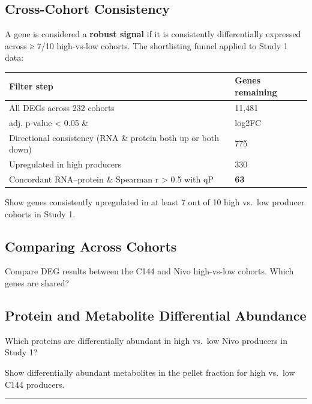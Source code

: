 \documentclass[
  letterpaper,
  oneside,
  open=any]{scrbook}
\newcounter{none} %
\begin{document}
\subsection{Cross-Cohort Consistency}\label{cross-cohort-consistency}

A gene is considered a \textbf{robust signal} if it is consistently
differentially expressed across ≥ 7/10 high-vs-low cohorts. The
shortlisting funnel applied to Study 1 data:

{\def\LTcaptype{none} %
\begin{longtable}[]{@{}ll@{}}
\toprule\noalign{}
Filter step & Genes remaining \\
\midrule\noalign{}
\endhead
\bottomrule\noalign{}
\endlastfoot
All DEGs across 232 cohorts & 11,481 \\
adj. p-value \textless{} 0.05 \& & log2FC \\
Directional consistency (RNA \& protein both up or both down) & 775 \\
Upregulated in high producers & 330 \\
Concordant RNA--protein \& Spearman r \textgreater{} 0.5 with qP &
\textbf{63} \\
\end{longtable}
}

Show genes consistently upregulated in at least 7 out of 10 high vs.~low
producer cohorts in Study 1.

\subsection{Comparing Across Cohorts}\label{comparing-across-cohorts}

Compare DEG results between the C144 and Nivo high-vs-low cohorts. Which
genes are shared?

\subsection{Protein and Metabolite Differential
Abundance}\label{protein-and-metabolite-differential-abundance}

Which proteins are differentially abundant in high vs.~low Nivo
producers in Study 1?

Show differentially abundant metabolites in the pellet fraction for high
vs.~low C144 producers.

\begin{center}\rule{0.5\linewidth}{0.5pt}\end{center}
\end{document}
